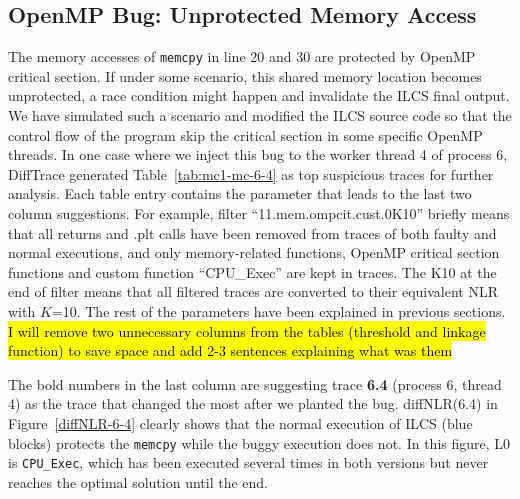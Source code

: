 \subsection{OpenMP Bug: Unprotected Memory Access}





The memory accesses of \texttt{memcpy} in line 20 and 30 are protected by OpenMP critical section.
%
If under some scenario, this shared memory location becomes unprotected, a race condition might happen and invalidate the ILCS final output.
%
We have simulated such a scenario and modified the ILCS source code so that the control flow of the program skip the critical section in some specific OpenMP threads.
%
In one case where we inject this bug to the worker thread 4 of process 6, DiffTrace generated Table~\ref{tab:mc1-mc-6-4} as top suspicious traces for further analysis.
%
Each table entry contains the parameter that leads to the last two column suggestions.
%
For example, filter ``11.mem.ompcit.cust.0K10'' briefly means that all returns and .plt calls have been removed from traces of both faulty and normal executions, and only memory-related functions, OpenMP critical section functions and custom function ``CPU\_Exec'' are kept in traces.
%
The K10 at the end of filter means that all filtered traces are converted to their equivalent NLR with $K$=10.
%
The rest of the parameters have been explained in previous sections.
%
\hl{I will remove two unnecessary columns from the tables (threshold and linkage function) to save space and add 2-3 sentences explaining what was them}

The bold numbers in the last column are suggesting trace \textbf{6.4} (process 6, thread 4) as the trace that changed the most after we planted the bug.
%
diffNLR(6.4) in Figure~\ref{diffNLR-6-4} clearly shows that the normal execution of ILCS (blue blocks) protects the \texttt{memcpy} while the buggy execution does not. In this figure, L0 is \texttt{CPU\_Exec}, which has been executed several times in both versions but never reaches the optimal solution until the end.
%






